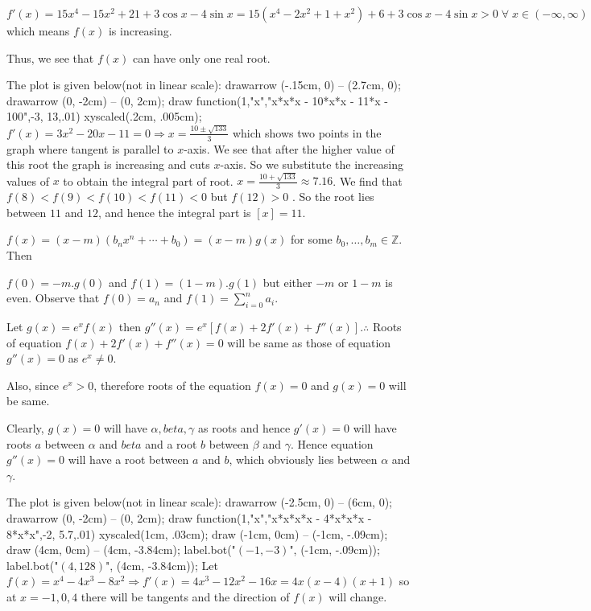   $f'(x) = 15x^4 - 15x^2 + 21 + 3\cos x - 4\sin x = 15(x^4 - 2x^2 + 1 + x^2) + 6 + 3\cos x - 4\sin x >
  0\;\forall\;x\in(-\infty, \infty)$ which means $f(x)$ is increasing.

  Thus, we see that $f(x)$ can have only one real root.
\item The plot is given below(not in linear scale):
  \startplacefigure[location={left,none}]
    \startMPcode
      drawarrow (-.15cm, 0) -- (2.7cm, 0);
      drawarrow (0, -2cm) -- (0, 2cm);
      draw function(1,"x","x*x*x - 10*x*x - 11*x - 100",-3, 13,.01) xyscaled(.2cm, .005cm);
    \stopMPcode
  \stopplacefigure
  $f'(x) = 3x^2 - 20x - 11 = 0 \Rightarrow x = \frac{10\pm\sqrt{133}}{3}$ which shows two points in the
  graph where tangent is parallel to $x$-axis. We see that after the higher value of this root the graph is
  increasing and cuts $x$-axis. So we substitute the increasing values of $x$ to obtain the integral part of
  root. $x = \frac{10 + \sqrt{133}}{3}\approx 7.16$. We find that $f(8) < f(9) < f(10) < f(11) < 0$ but
  $f(12) > 0$ . So the root lies between $11$ and $12$, and hence the integral part is $[x] = 11$.
  \vskip 0.9cm
\item $f(x)=(x-m)(b_n x^n+\cdots + b_0)=(x-m)g(x)$ for some $b_0, \ldots, b_m\in\mathbb{Z}$. Then

  $f(0) = -m.g(0)$ and $f(1) = (1 - m).g(1)$ but either $-m$ or $1 - m$ is even. Observe that $f(0) = a_n$
  and $f(1) = \displaystyle\sum_{i=0}^na_i$.
\item Let $g(x) = e^xf(x)$ then $g''(x) = e^x[f(x) + 2f'(x) + f''(x)]. \therefore$ Roots of equation $f(x) +
  2f'(x) + f''(x) = 0$ will be same as those of equation $g''(x) = 0$ as $e^x\neq 0$.

  Also, since $e^x > 0$, therefore roots of the equation $f(x) = 0$ and $g(x) = 0$ will be same.

  Clearly, $g(x) = 0$ will have $\alpha, beta, \gamma$ as roots and hence $g'(x) = 0$ will have roots $a$
  between $\alpha$ and $beta$ and a root $b$ between $\beta$ and $\gamma$. Hence equation $g''(x) = 0$ will
  have a root between $a$ and $b$, which obviously lies between $\alpha$ and $\gamma$.
\item The plot is given below(not in linear scale):
  \startplacefigure[location={middle,none}]
    \startMPcode
      drawarrow (-2.5cm, 0) -- (6cm, 0);
      drawarrow (0, -2cm) -- (0, 2cm);
      draw function(1,"x","x*x*x*x - 4*x*x*x - 8*x*x",-2, 5.7,.01) xyscaled(1cm, .03cm);
      draw (-1cm, 0cm) -- (-1cm, -.09cm);
      draw (4cm, 0cm) -- (4cm, -3.84cm);
      label.bot("$(-1, -3)$", (-1cm, -.09cm));
      label.bot("$(4, 128)$", (4cm, -3.84cm));
    \stopMPcode
  \stopplacefigure
  Let $f(x) = x^4 - 4x^3 - 8x^2 \Rightarrow f'(x) = 4x^3 - 12x^2 - 16x = 4x(x - 4)(x + 1)$ so at $x =
  -1, 0, 4$ there will be tangents and the direction of $f(x)$ will change.

